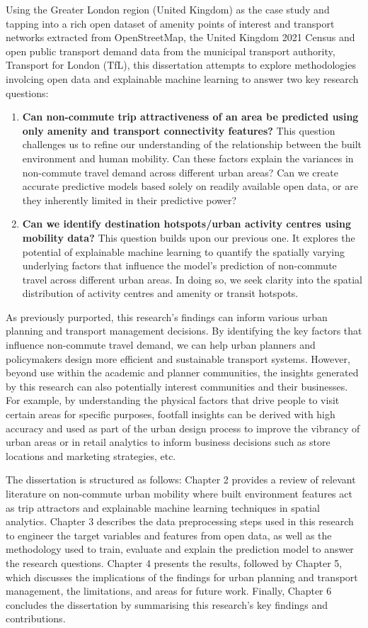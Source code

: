 Using the Greater London region (United Kingdom) as the case study and tapping into a rich open dataset of amenity points of interest and transport networks extracted from OpenStreetMap, the United Kingdom 2021 Census and open public transport demand data from the municipal transport authority, Transport for London (TfL), this dissertation attempts to explore methodologies involcing open data and explainable machine learning to answer two key research questions:

\begin{enumerate}
    \item \textbf{Can non-commute trip attractiveness of an area be predicted using only amenity and transport connectivity features?} This question challenges us to refine our understanding of the relationship between the built environment and human mobility. Can these factors explain the variances in non-commute travel demand across different urban areas? Can we create accurate predictive models based solely on readily available open data, or are they inherently limited in their predictive power?
    \item \textbf{Can we identify destination hotspots/urban activity centres using mobility data?} This question builds upon our previous one. It explores the potential of explainable machine learning to quantify the spatially varying underlying factors that influence the model's prediction of non-commute travel across different urban areas. In doing so, we seek clarity into the spatial distribution of activity centres and amenity or transit hotspots.
\end{enumerate}

As previously purported, this research's findings can inform various urban planning and transport management decisions. By identifying the key factors that influence non-commute travel demand, we can help urban planners and policymakers design more efficient and sustainable transport systems. However, beyond use within the academic and planner communities, the insights generated by this research can also potentially interest communities and their businesses. For example, by understanding the physical factors that drive people to visit certain areas for specific purposes, footfall insights can be derived with high accuracy and used as part of the urban design process to improve the vibrancy of urban areas or in retail analytics to inform business decisions such as store locations and marketing strategies, etc. 

The dissertation is structured as follows: Chapter 2 provides a review of relevant literature on non-commute urban mobility where built environment features act as trip attractors and explainable machine learning techniques in spatial analytics. Chapter 3 describes the data preprocessing steps used in this research to engineer the target variables and features from open data, as well as the methodology used to train, evaluate and explain the prediction model to answer the research questions. Chapter 4 presents the results, followed by Chapter 5, which discusses the implications of the findings for urban planning and transport management, the limitations, and areas for future work. Finally, Chapter 6 concludes the dissertation by summarising this research's key findings and contributions.